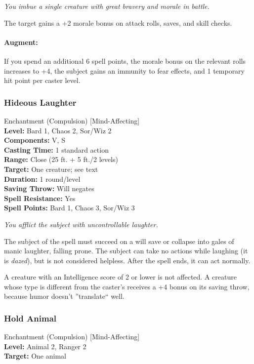 \emph{You imbue a single creature with great bravery and morale in battle.} 

The target gains a +2 morale bonus on attack rolls, saves, and skill checks.

\paragraph{Augment:} If you spend an additional 6 spell points, the morale bonus on the relevant rolls
increases to +4, the subject gains an immunity to fear effects, and 1 temporary hit point per caster level.
\subsubsection{Hideous Laughter}
\label{Spell:HideousLaughter}
Enchantment (Compulsion) [Mind-Affecting]
\\ \textbf{Level:} Bard 1, Chaos 2, Sor/Wiz 2
\\ \textbf{Components:} V, S
\\ \textbf{Casting Time:} 1 standard action
\\ \textbf{Range:} Close (25 ft. + 5 ft./2 levels)
\\ \textbf{Target:} One creature; see text
\\ \textbf{Duration:} 1 round/level
\\ \textbf{Saving Throw:} Will negates
\\ \textbf{Spell Resistance:} Yes
\\ \textbf{Spell Points:} Bard 1, Chaos 3, Sor/Wiz 3

\emph{You afflict the subject with uncontrollable laughter.} 

The subject of the spell must succeed on a will save or collapse into gales of manic laughter, falling prone. 
The subject can take no actions while laughing (it is \emph{dazed}), but is not considered helpless. After the spell ends, it can act normally.

A creature with an Intelligence score of 2 or lower is not affected. 
A creature whose type is different from the caster's receives a +4 bonus on its saving throw, because humor doesn't ''translate`` well.

\subsubsection{Hold Animal}
\label{Spell:HoldAnimal}
Enchantment (Compulsion) [Mind-Affecting]
\\ \textbf{Level:} Animal 2, Ranger 2
\\ \textbf{Target:} One animal

